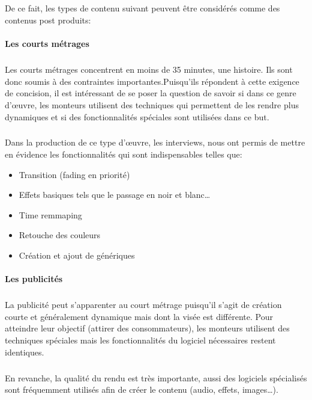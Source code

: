 \subparagraph{}
De ce fait, les types de contenu suivant peuvent être considérés comme des contenus post produits:

\paragraph{Les courts métrages}

\subparagraph{}
Les courts métrages concentrent en moins de 35 minutes, une histoire. Ils sont donc soumis
à des contraintes importantes.Puisqu'ils répondent à cette exigence de concision,
il est intéressant de se poser la question de savoir si dans ce genre
d'œuvre, les monteurs utilisent des techniques qui permettent
de les rendre plus dynamiques et si des fonctionnalités spéciales sont utilisées dans
ce but.

\subparagraph{}
Dans la production de ce type d'œuvre, les interviews, nous ont permis de mettre en évidence
les fonctionnalités qui sont indispensables telles que:
\begin{itemize}
  \item{Transition (fading en priorité)}
  \item{Effets basiques tels que le passage en noir et blanc\ldots}
  \item{Time remmaping}
  \item{Retouche des couleurs}
  \item{Création et ajout de génériques}
\end{itemize}

\paragraph {Les publicités}
\subparagraph{}
La publicité peut s'apparenter au court métrage puisqu'il s'agit de création
courte et généralement dynamique mais dont la visée est différente. Pour atteindre
leur objectif (attirer des consommateurs), les monteurs utilisent des
techniques spéciales mais les fonctionnalités du logiciel nécessaires restent
identiques.

\subparagraph{}
En revanche, la qualité du rendu est très importante, aussi des logiciels spécialisés
sont fréquemment utilisés afin de créer le contenu (audio, effets, images\ldots).

